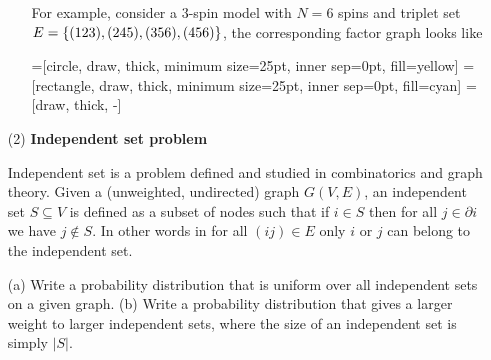 \documentclass[a4paper,oneside,12pt]{article}
\begin{document}
\begin{itemize}
\begin{solution}
\begin{enumerate}[(a)]
            For example, consider a $ 3 $-spin model with $ N = 6 $ spins and triplet set $ E = \left\lbrace  (123), (245), (356), (456)  \right\rbrace $, the corresponding factor graph looks like
            \begin{center}
            =[circle, draw, thick, minimum size=25pt, inner sep=0pt, fill=yellow]
            =[rectangle, draw, thick, minimum size=25pt, inner sep=0pt, fill=cyan]
             = [draw, thick, -]
            \end{center}
    \end{enumerate}
    \end{solution}
    

\item[(2)] {\bf Independent set problem}

    Independent set is a problem defined and studied in combinatorics and
    graph theory. Given a (unweighted, undirected) graph $G(V,E)$, an independent set $S \subseteq V$ is
    defined as a
    subset of nodes such that if $i \in S$ then for all $j
    \in \partial i$ we have $j \notin S$. In other words in for all $(ij)\in E$
    only $i$ or $j$ can belong to the independent set. 

    (a) Write a probability distribution that is uniform over all
    independent sets on a given graph. (b) Write a probability distribution
    that gives a larger weight to larger independent sets, where the
    size of an independent set is simply $|S|$. 


\end{itemize}
\end{document}
